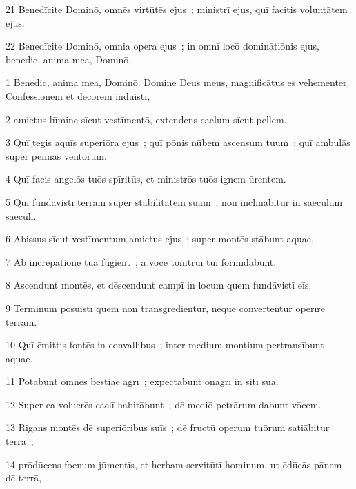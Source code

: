 \psalmVerse
  {\phantom{0}21}
  {Benedīcite Dominō, omnēs virtūtēs ejus~; ministrī ejus, quī facitis voluntātem ejus.}


\psalmVerse
  {\phantom{0}22}
  {Benedīcite Dominō, omnia opera ejus~; in omnī locō dominātiōnis ejus, benedic, anima mea, Dominō.}




\psalmVerse
  {\phantom{00}1}
  {Benedic, anima mea, Dominō. Domine Deus meus, magnificātus es vehementer. Confessiōnem et decōrem induistī,}


\psalmVerse
  {\phantom{00}2}
  {amictus lūmine sīcut vestīmentō, extendens caelum sīcut pellem.}


\psalmVerse
  {\phantom{00}3}
  {Quī tegis aquīs superiōra ejus~; quī pōnis nūbem ascensum tuum~; quī ambulās super pennās ventōrum.}


\psalmVerse
  {\phantom{00}4}
  {Quī facis angelōs tuōs spīritūs, et ministrōs tuōs ignem ūrentem.}


\psalmVerse
  {\phantom{00}5}
  {Quī fundāvistī terram super stabilitātem suam~; nōn inclīnābitur in saeculum saeculī.}


\psalmVerse
  {\phantom{00}6}
  {Abissus sīcut vestīmentum amictus ejus~; super montēs stābunt aquae.}


\psalmVerse
  {\phantom{00}7}
  {Ab increpātiōne tuā fugient~; ā vōce tonitruī tuī formīdābunt.}


\psalmVerse
  {\phantom{00}8}
  {Ascendunt montēs, et dēscendunt campī in locum quem fundāvistī eīs.}


\psalmVerse
  {\phantom{00}9}
  {Terminum posuistī quem nōn transgredientur, neque convertentur operīre terram.}


\psalmVerse
  {\phantom{0}10}
  {Quī ēmittis fontēs in convallibus~; inter medium montium pertransībunt aquae.}


\psalmVerse
  {\phantom{0}11}
  {Pōtābunt omnēs bēstiae agrī~; expectābunt onagrī in sitī suā.}


\psalmVerse
  {\phantom{0}12}
  {Super ea volucrēs caelī habitābunt~; dē mediō petrārum dabunt vōcem.}


\psalmVerse
  {\phantom{0}13}
  {Rigans montēs dē superiōribus suīs~; dē fructū operum tuōrum satiābitur terra~;}


\psalmVerse
  {\phantom{0}14}
  {prōdūcens foenum jūmentīs, et herbam servitūtī hominum, ut ēdūcās pānem dē terrā,}


